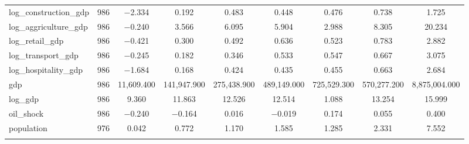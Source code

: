 \documentclass[12pt]{article}
\numberwithin{equation}{section}
\numberwithin{table}{section}
\numberwithin{figure}{section}
\begin{document}
\begin{table}
\begin{tabular}{@{\extracolsep{5pt}}lcccccccc}
log\_construction\_gdp & 986 & $-$2.334 & 0.192 & 0.483 & 0.448 & 0.476 & 0.738 & 1.725 \\ 
log\_aggriculture\_gdp & 986 & $-$0.240 & 3.566 & 6.095 & 5.904 & 2.988 & 8.305 & 20.234 \\ 
log\_retail\_gdp & 986 & $-$0.421 & 0.300 & 0.492 & 0.636 & 0.523 & 0.783 & 2.882 \\ 
log\_transport\_gdp & 986 & $-$0.245 & 0.182 & 0.346 & 0.533 & 0.547 & 0.667 & 3.075 \\ 
log\_hospitality\_gdp & 986 & $-$1.684 & 0.168 & 0.424 & 0.435 & 0.455 & 0.663 & 2.684 \\ 
gdp & 986 & 11,609.400 & 141,947.900 & 275,438.900 & 489,149.000 & 725,529.300 & 570,277.200 & 8,875,004.000 \\ 
log\_gdp & 986 & 9.360 & 11.863 & 12.526 & 12.514 & 1.088 & 13.254 & 15.999 \\ 
oil\_shock & 986 & $-$0.240 & $-$0.164 & 0.016 & $-$0.019 & 0.174 & 0.055 & 0.400 \\ 
population & 976 & 0.042 & 0.772 & 1.170 & 1.585 & 1.285 & 2.331 & 7.552 \\ 
\hline \\[-1.8ex] 
\end{tabular} 
\end{table} 
\end{document}
